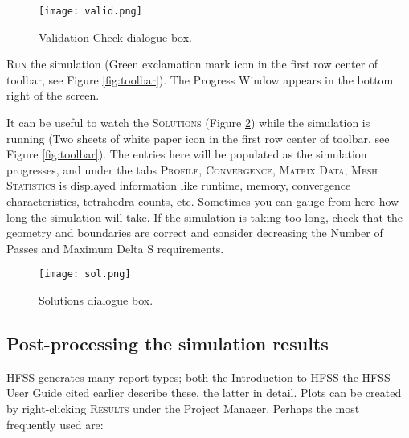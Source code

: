 \documentclass[11pt]{article}
\begin{document}
\begin{figure}[H]
	\centering
	\texttt{[image: valid.png]}
	\caption{Validation Check dialogue box.}
	\label{fig:valid}
\end{figure}

\textsc{Run} the simulation (Green exclamation mark icon in the first row center of toolbar, see Figure \ref{fig:toolbar}). The Progress Window appears in the bottom right of the screen.

It can be useful to watch the \textsc{Solutions} (Figure \ref{fig:sol}) while the simulation is running (Two sheets of white paper icon in the first row center of toolbar, see Figure \ref{fig:toolbar}). The entries here will be populated as the simulation progresses, and under the tabs \textsc{Profile, Convergence, Matrix Data,  Mesh Statistics} is displayed information like runtime, memory, convergence characteristics, tetrahedra counts, etc. Sometimes you can gauge from here how long the simulation will take. If the simulation is taking too long, check that the geometry and boundaries are correct and consider decreasing the Number of Passes and Maximum Delta S requirements.

\begin{figure}[H]
	\centering
	\texttt{[image: sol.png]}
	\caption{Solutions dialogue box.}
	\label{fig:sol}
\end{figure}



\subsection{Post-processing the simulation results}

HFSS generates many report types; both the Introduction to HFSS the HFSS User Guide cited earlier describe these, the latter in detail. Plots can be created by right-clicking \textsc{Results} under the Project Manager. Perhaps the most frequently used are:
\end{document}
